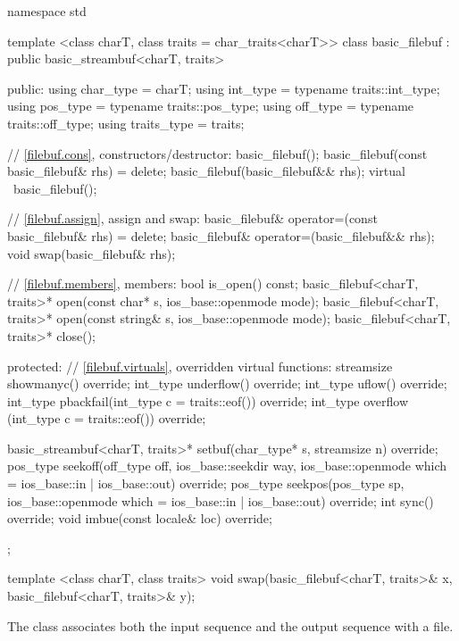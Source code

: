 %
\begin{codeblock}
namespace std {
  template <class charT, class traits = char_traits<charT>>
  class basic_filebuf
    : public basic_streambuf<charT, traits> {
  public:
    using char_type   = charT;
    using int_type    = typename traits::int_type;
    using pos_type    = typename traits::pos_type;
    using off_type    = typename traits::off_type;
    using traits_type = traits;

    // \ref{filebuf.cons}, constructors/destructor:
    basic_filebuf();
    basic_filebuf(const basic_filebuf& rhs) = delete;
    basic_filebuf(basic_filebuf&& rhs);
    virtual ~basic_filebuf();

    // \ref{filebuf.assign}, assign and swap:
    basic_filebuf& operator=(const basic_filebuf& rhs) = delete;
    basic_filebuf& operator=(basic_filebuf&& rhs);
    void swap(basic_filebuf& rhs);

    // \ref{filebuf.members}, members:
    bool is_open() const;
    basic_filebuf<charT, traits>* open(const char* s,
                                       ios_base::openmode mode);
    basic_filebuf<charT, traits>* open(const string& s,
                                       ios_base::openmode mode);
    basic_filebuf<charT, traits>* close();

  protected:
    // \ref{filebuf.virtuals}, overridden virtual functions:
    streamsize showmanyc() override;
    int_type underflow() override;
    int_type uflow() override;
    int_type pbackfail(int_type c = traits::eof()) override;
    int_type overflow (int_type c = traits::eof()) override;

    basic_streambuf<charT, traits>* setbuf(char_type* s,
                                           streamsize n) override;
    pos_type seekoff(off_type off, ios_base::seekdir way,
                     ios_base::openmode which
                      = ios_base::in | ios_base::out) override;
    pos_type seekpos(pos_type sp,
                     ios_base::openmode which
                      = ios_base::in | ios_base::out) override;
    int      sync() override;
    void     imbue(const locale& loc) override;
  };

  template <class charT, class traits>
    void swap(basic_filebuf<charT, traits>& x,
              basic_filebuf<charT, traits>& y);
}
\end{codeblock}

\pnum
The class
associates both the input sequence and the output
sequence with a file.

